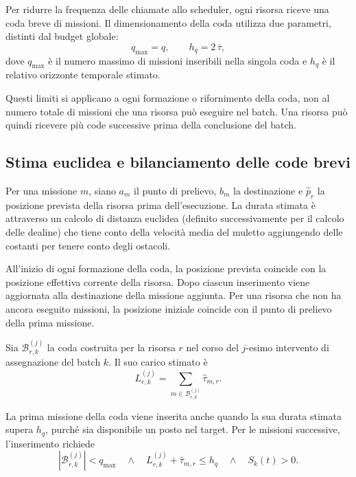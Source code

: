 Per ridurre la frequenza delle chiamate allo scheduler,
ogni risorsa riceve una coda breve di missioni.
Il dimensionamento della coda utilizza due parametri,
distinti dal budget globale:
\begin{equation}
	q_{\max}= q,
	\qquad
	h_q=2\,\overline{\tau},
\end{equation}
dove $q_{\max}$ è il numero massimo di missioni
inseribili nella singola coda e $h_q$ è il relativo
orizzonte temporale stimato.

Questi limiti si applicano a ogni formazione
o rifornimento della coda, non al numero totale
di missioni che una risorsa può eseguire nel batch.
Una risorsa può quindi ricevere più code successive
prima della conclusione del batch.

\subsection{Stima euclidea e bilanciamento delle code brevi}

Per una missione $m$, siano $a_m$ il punto di prelievo,
$b_m$ la destinazione e $\widehat{p}_r$ la posizione
prevista della risorsa prima dell'esecuzione.
La durata stimata è attraverso un calcolo di distanza euclidea (definito successivamente per il calcolo delle dealine) che tiene conto della velocità media del muletto aggiungendo delle costanti per tenere conto degli ostacoli.

All'inizio di ogni formazione della coda, la posizione
prevista coincide con la posizione effettiva corrente
della risorsa. Dopo ciascun inserimento viene aggiornata
alla destinazione della missione aggiunta.
Per una risorsa che non ha ancora eseguito missioni,
la posizione iniziale coincide con il punto di prelievo
della prima missione.

Sia $\mathcal{B}_{r,k}^{(j)}$ la coda costruita per
la risorsa $r$ nel corso del $j$-esimo intervento
di assegnazione del batch $k$. Il suo carico stimato è
\begin{equation}
	L_{r,k}^{(j)}
	=
	\sum_{m\in\mathcal{B}_{r,k}^{(j)}}
	\widehat{\tau}_{m,r}.
\end{equation}

\noindent La prima missione della coda viene inserita anche
quando la sua durata stimata supera $h_q$, purché
sia disponibile un posto nel target.
Per le missioni successive, l'inserimento richiede
\begin{equation}
	\left|\mathcal{B}_{r,k}^{(j)}\right|<q_{\max}
	\quad\land\quad
	L_{r,k}^{(j)}+\widehat{\tau}_{m,r}\leq h_q
	\quad\land\quad
	S_k(t)>0.
	\label{eq:inserimento_coda_breve}
\end{equation}

